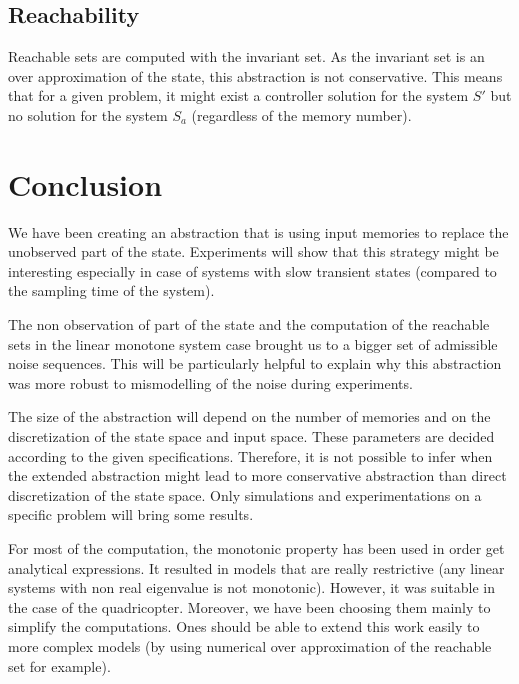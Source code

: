 \subsection{Reachability}
Reachable sets are computed with the invariant set. As the invariant set is an over approximation of the state, this abstraction is not conservative. This means that for a given problem, it might exist a controller solution for the system $S'$ but no solution for the system $S_a$ (regardless of the memory number).

\section{Conclusion}
We have been creating an abstraction that is using input memories to replace the unobserved part of the state.
Experiments will show that this strategy might be interesting especially in case of systems with slow transient states (compared to the sampling time of the system).

The non observation of part of the state and the computation of the reachable sets in the linear monotone system case brought us to a bigger set of admissible noise sequences.
This will be particularly helpful to explain why this abstraction was more robust to mismodelling of the noise during experiments.

The size of the abstraction will depend on the number of memories and on the discretization of the state space and input space. These parameters are decided according to the given specifications. Therefore, it is not possible to infer when the extended abstraction might lead to more conservative abstraction than direct discretization of the state space.
Only simulations and experimentations on a specific problem will bring some results.

For most of the computation, the monotonic property has been used in order get analytical expressions.
It resulted in models that are really restrictive (any linear systems with non real eigenvalue is not monotonic). However, it was suitable in the case of the quadricopter.
Moreover, we have been choosing them mainly to simplify the computations. Ones should be able to extend this work easily to more complex models (by using numerical over approximation of the reachable set for example).
